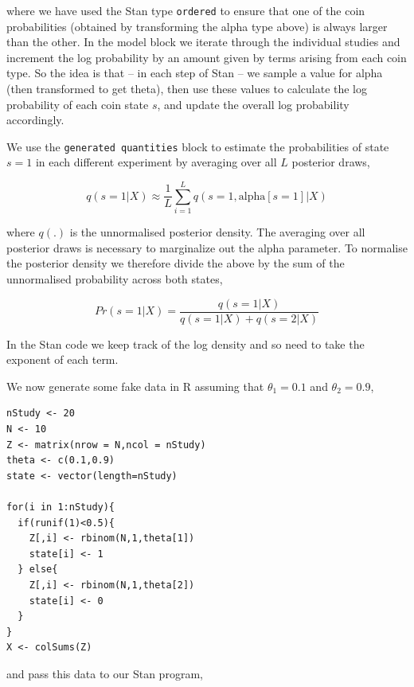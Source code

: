 \documentclass[11pt,fullpage]{book}
\begin{document}
where we have used the Stan type \texttt{ordered} to ensure that one of the coin probabilities (obtained by transforming the alpha type above) is always larger than the other. In the model block we iterate through the individual studies and increment the log probability by an amount given by terms arising from each coin type. So the idea is that -- in each step of Stan -- we sample a value for alpha (then transformed to get theta), then use these values to calculate the log probability of each coin state $s$, and update the overall log probability accordingly.

We use the \texttt{generated quantities} block to estimate the probabilities of state $s=1$ in each different experiment by averaging over all $L$ posterior draws,

\begin{equation}
q(s=1|X) \approx \frac{1}{L} \sum_{i=1}^{L} q(s=1,\text{alpha}[s=1]|X)
\end{equation}

where $q(.)$ is the unnormalised posterior density. The averaging over all posterior draws is necessary to marginalize out the alpha parameter. To normalise the posterior density we therefore divide the above by the sum of the unnormalised probability across both states,

\begin{equation}
Pr(s=1|X) = \frac{q(s=1|X)}{q(s=1|X)+q(s=2|X)}
\end{equation} 

In the Stan code we keep track of the log density and so need to take the exponent of each term. 

We now generate some fake data in R assuming that $\theta_1 = 0.1$ and $\theta_2 = 0.9$,

\begin{verbatim}
nStudy <- 20
N <- 10
Z <- matrix(nrow = N,ncol = nStudy)
theta <- c(0.1,0.9)
state <- vector(length=nStudy)
  
for(i in 1:nStudy){
  if(runif(1)<0.5){
    Z[,i] <- rbinom(N,1,theta[1])
    state[i] <- 1
  } else{
    Z[,i] <- rbinom(N,1,theta[2])
    state[i] <- 0
  }
}
X <- colSums(Z)
\end{verbatim}

and pass this data to our Stan program,
\end{document}
